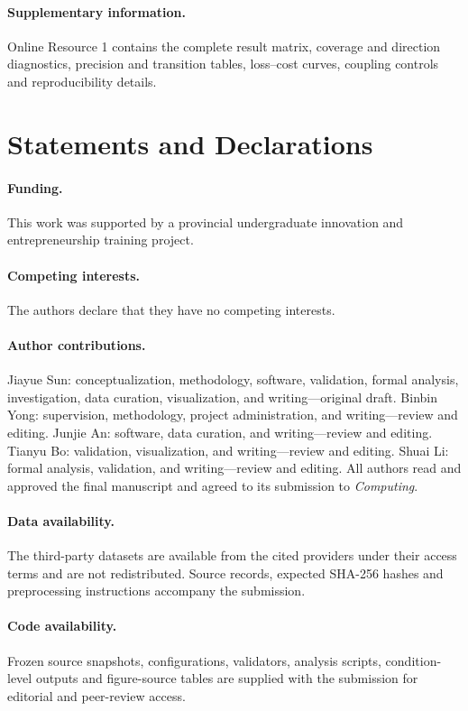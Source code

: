 \documentclass[smallextended]{svjour3}
\begin{document}
\paragraph{Supplementary information.} Online Resource 1 contains the complete result matrix, coverage and direction diagnostics, precision and transition tables, loss--cost curves, coupling controls and reproducibility details.
\section*{Statements and Declarations}
\paragraph{Funding.} This work was supported by a provincial undergraduate innovation and entrepreneurship training project.
\paragraph{Competing interests.} The authors declare that they have no competing interests.
\paragraph{Author contributions.} Jiayue Sun: conceptualization, methodology, software, validation, formal analysis, investigation, data curation, visualization, and writing---original draft. Binbin Yong: supervision, methodology, project administration, and writing---review and editing. Junjie An: software, data curation, and writing---review and editing. Tianyu Bo: validation, visualization, and writing---review and editing. Shuai Li: formal analysis, validation, and writing---review and editing. All authors read and approved the final manuscript and agreed to its submission to \textit{Computing}.
\paragraph{Data availability.} The third-party datasets are available from the cited providers under their access terms and are not redistributed. Source records, expected SHA-256 hashes and preprocessing instructions accompany the submission.
\paragraph{Code availability.} Frozen source snapshots, configurations, validators, analysis scripts, condition-level outputs and figure-source tables are supplied with the submission for editorial and peer-review access.

\end{document}
